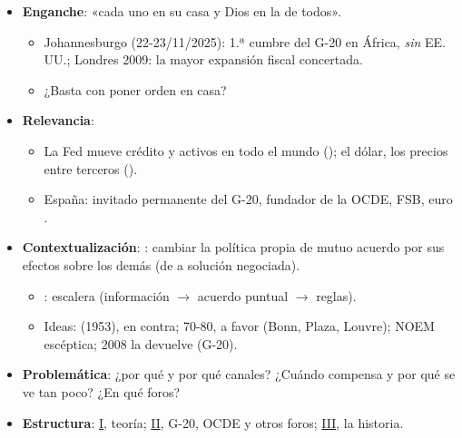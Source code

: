 \documentclass{article}
\begin{document}
\cabecerarepaso
\begin{columnas}

\begin{itemize}
\item \textbf{Enganche}: «cada uno en su casa y Dios en la de todos».
  \begin{itemize}
  \item Johannesburgo (22-23/11/2025): 1.ª cumbre del G-20 en África, \emph{sin} EE.\,UU.; Londres 2009: la mayor expansión fiscal concertada.
  \item ¿Basta con poner orden en casa?
  \end{itemize}
\item \textbf{Relevancia}:
  \begin{itemize}
  \item La Fed mueve crédito y activos en todo el mundo (); el dólar, los precios entre terceros ().
  \item España: invitado permanente del G-20, fundador de la OCDE, FSB, euro .
  \end{itemize}
\item \textbf{Contextualización}: : cambiar la política propia de mutuo acuerdo por sus efectos sobre los demás (de  a solución negociada).
  \begin{itemize}
  \item {}: escalera (información $\to$ acuerdo puntual $\to$ reglas).
  \item Ideas:  (1953), en contra; 70-80, a favor (Bonn, Plaza, Louvre); NOEM escéptica; 2008 la devuelve (G-20).
  \end{itemize}
\item \textbf{Problemática}: ¿por qué y por qué canales? ¿Cuándo compensa y por qué se ve tan poco? ¿En qué foros?
\item \textbf{Estructura}: \hyperref[rep:I]{I}, teoría; \hyperref[rep:II]{II}, G-20, OCDE y otros foros; \hyperref[rep:III]{III}, la historia.
\end{itemize}


\end{columnas}
\end{document}
